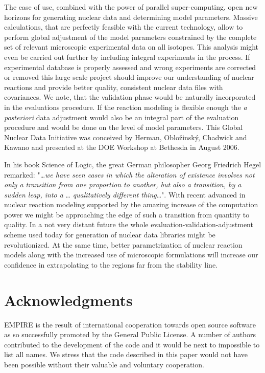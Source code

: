 The ease of use, combined with the power of parallel super-computing, open
new horizons for generating nuclear data and determining model parameters.
Massive calculations, that are perfectly feasible with the current
technology, allow to perform global adjustment of the model parameters
constrained by the complete set of relevant microscopic experimental data on
all isotopes. This analysis might even be carried out further by including
integral experiments in the process. If experimental database is properly
assessed and wrong experiments are corrected or removed this large scale
project should improve our understanding of nuclear reactions and provide
better quality, consistent nuclear data files with covariances. We note,
that the validation phase would be naturally incorporated in the evaluations
procedure. If the reaction modeling is flexible enough the \textit{a
posteriori} data adjustment would also be an integral part of the evaluation
procedure and would be done on the level of model parameters. This Global
Nuclear Data Initiative was conceived by Herman, Oblo\v zinsk\' y, Chadwick
and Kawano and presented at the DOE Workshop at Bethesda in August 2006.

In his book Science of Logic, the great German philosopher Georg Friedrich
Hegel remarked: "\ldots \textit{we have seen cases in which the alteration
of existence involves not only a transition from one proportion to another,
but also a transition, by a sudden leap, into a} \ldots \textit{%
qualitatively different thing}\ldots". With recent advanced in nuclear
reaction modeling supported by the amazing increase of the computation power
we might be approaching the edge of such a transition from quantity to
quality. In a not very distant future the whole
evaluation-validation-adjustment scheme used today for generation of nuclear
data libraries might be revolutionized. At the same time, better
parametrization of nuclear reaction models along with the increased use of
microscopic formulations will increase our confidence in extrapolating to
the regions far from the stability line.

\section*{Acknowledgments}

EMPIRE is the result of international cooperation towards open source
software as so successfully promoted by the General Public License. A number
of authors contributed to the development of the code and it would be next
to impossible to list all names. We stress that the code described in this
paper would not have been possible without their valuable and voluntary
cooperation.

